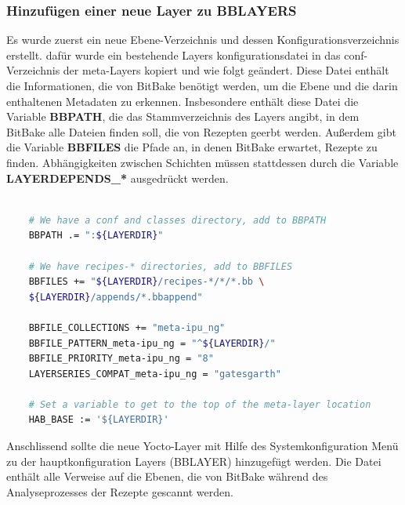 	\subsubsection{Hinzufügen einer neue Layer zu BBLAYERS}
	Es wurde zuerst ein neue Ebene-Verzeichnis und dessen Konfigurationsverzeichnis erstellt. dafür wurde ein bestehende Layers konfigurationsdatei in das conf-Verzeichnis der meta-Layers kopiert und wie folgt geändert. Diese Datei enthält die Informationen, die von BitBake benötigt werden, um die Ebene und die darin enthaltenen Metadaten zu erkennen. Insbesondere enthält diese Datei die Variable \textbf{BBPATH}, die das Stammverzeichnis des Layers angibt, in dem BitBake alle Dateien finden soll, die von Rezepten geerbt werden. Außerdem gibt die Variable \textbf{BBFILES} die Pfade an, in denen BitBake erwartet, Rezepte zu finden. Abhängigkeiten zwischen Schichten müssen stattdessen durch die Variable \textbf{LAYERDEPENDS_*} ausgedrückt werden.

	\begin{lstlisting}[backgroundcolor = \color{lightgray},basicstyle=\scriptsize\ttfamily,caption={Hinzufügen neue Yocto-ebene},label=lst:ipu:ng:layer,language=bash,framexleftmargin = 2em]
		
	# We have a conf and classes directory, add to BBPATH
	BBPATH .= ":${LAYERDIR}"
	
	# We have recipes-* directories, add to BBFILES
	BBFILES += "${LAYERDIR}/recipes-*/*/*.bb \
	${LAYERDIR}/appends/*.bbappend"
	
	BBFILE_COLLECTIONS += "meta-ipu_ng"
	BBFILE_PATTERN_meta-ipu_ng = "^${LAYERDIR}/"
	BBFILE_PRIORITY_meta-ipu_ng = "8"
	LAYERSERIES_COMPAT_meta-ipu_ng = "gatesgarth"
	
	# Set a variable to get to the top of the meta-layer location
	HAB_BASE := '${LAYERDIR}'
	\end{lstlisting}

	Anschlissend sollte die neue Yocto-Layer mit Hilfe des Systemkonfiguration Menü zu der hauptkonfiguration Layers (BBLAYER) hinzugefügt werden. Die Datei enthält alle Verweise auf die Ebenen, die von BitBake während des Analyseprozesses der Rezepte gescannt werden.
	
